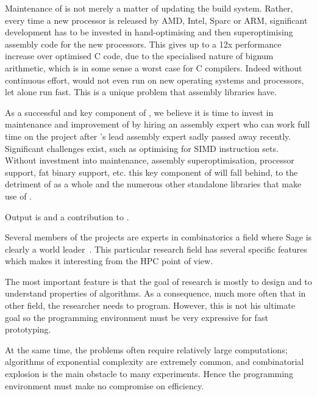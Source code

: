 \begin{workpackage}
\begin{tasklist}
\begin{task}[title=\MPIR,id=hpc-mpir, lead=UK,PM=13,wphases=6-18,issue=103]
Maintenance of \MPIR is not merely a matter of updating the build system.
Rather, every time a new processor is released by AMD, Intel, Sparc or ARM,
significant development has to be invested in hand-optimising and then
superoptimising assembly code for the new processors. This gives up to a 12x
performance increase over optimised C code, due to the specialised nature of
bignum arithmetic, which is in some sense a worst case for C compilers. Indeed
without continuous effort, \MPIR would not even run on new operating systems and
processors, let alone run fast. This is a unique problem that assembly libraries
have.

As a successful and key component of \Sage, we believe it is time to invest in
maintenance and improvement of \MPIR by hiring an assembly expert who can work
full time on the project after \MPIR's lead assembly expert sadly passed
away recently. Significant challenges exist, such as
optimising for SIMD instruction sets. Without investment into maintenance,
assembly superoptimisation, processor support, fat binary support, etc. this key
component of \Sage will fall behind, to the detriment of \Sage as a whole and the
numerous other standalone libraries that make use of \MPIR.

Output is  and a contribution to .
\end{task}

\begin{task}[title=HPC infrastructure for combinatorics,id=hpc-combi,PM=26,lead=PS,partners={UB},wphases={0-6!0.3,12-36!0.5},issue=104]
  Several members of the projects are experts in combinatorics a field where
  Sage is clearly a world leader~\cite{Sage-Combinat}. This particular research
  field has several specific features which makes it interesting from the HPC
  point of view.

  The most important feature is that the goal of research is mostly to
  design and to understand properties of algorithms. As a consequence,
  much more often that in other field, the researcher needs to
  program. However, this is not his ultimate goal so the programming
  environment must be very expressive for fast prototyping.

  At the same time, the problems often require relatively large
  computations; algorithms of exponential complexity are extremely
  common, and combinatorial explosion is the main obstacle to many
  experiments. Hence the programming environment must make no
  compromise on efficiency.


\end{task}
\end{tasklist}
\end{workpackage}
